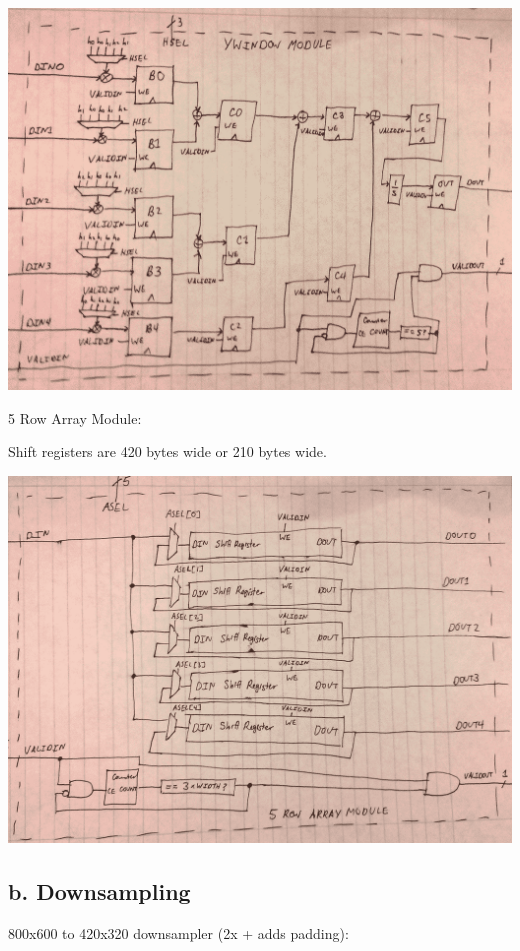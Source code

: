 \documentclass[11pt]{article}
\begin{document}
\noindent\includegraphics[width=\textwidth]{modules/procy_window.png}

\newpage

5 Row Array Module:

Shift registers are 420 bytes wide or 210 bytes wide.

\noindent\includegraphics[width=\textwidth]{modules/proc5row.png}

\newpage

\subsection*{b. Downsampling}

800x600 to 420x320 downsampler (2x + adds padding):
\end{document}
